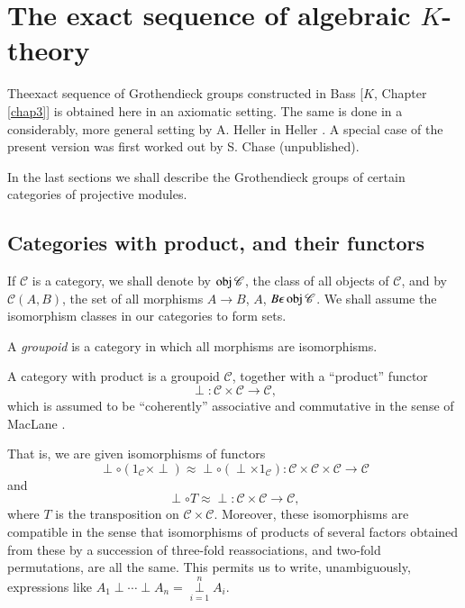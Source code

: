 \chapter{The exact sequence of algebraic $K$-theory}\label{chap1}%

The\pageoriginale exact sequence of Grothendieck groups constructed in
Bass [$K$, Chapter \ref{chap3}] is obtained here in an axiomatic
setting. The same is 
done in a considerably, more general setting by A. Heller in Heller
\cite{key1}. A special case of the present version was first worked out by
S. Chase (unpublished). 

In the last sections we shall describe the Grothendieck groups of
certain categories of projective modules. 


\section{Categories with product, and their
  functors}\label{chap1:sec1}%

If $\mathscr{C}$ is a category, we shall denote by $\operatorname{obj} \mathscr{C}$,
the class of all objects of $\mathscr{C}$, and by $\mathscr{C}(A, B)$,
the set of all morphisms $A \to B$, $A$, $B \epsilon \operatorname{obj}
\mathscr{C}$. We shall assume the isomorphism classes in our
categories to form sets.  

A \textit{groupoid} is a category in which all morphisms are isomorphisms.

\begin{defi*}
A category with product is a groupoid $\mathscr{C}$, together
with a ``product'' functor 
$$
\perp : \mathscr{C} \times \mathscr{C} \to \mathscr{C},  
$$
which is assumed to be ``coherently'' associative and commutative in
the sense of MacLane \cite{key1}. 
\end{defi*}

That is, we are given isomorphisms of functors
$$
\perp \circ (1_\mathscr{C} \times \perp ) \approx \perp \circ (\perp \times
1_\mathscr{C}) : \mathscr{C} \times \mathscr{C} \times \mathscr{C} \to
\mathscr{C} 
$$
and\pageoriginale 
$$
\perp \circ T \approx \perp : \mathscr{C} \times \mathscr{C} \to
\mathscr{C}, 
$$
where $T$ is the transposition on $\mathscr{C} \times \mathscr{C}
$. Moreover, these isomorphisms are compatible in the sense that
isomorphisms of products of several factors obtained from these by a
succession of three-fold reassociations, and two-fold permutations, are
all the same. This permits us to write, unambiguously, expressions
like $A_1 \perp \cdots \perp A_n = \overset n {\underset{i=1}
  \perp} A_i$. 

